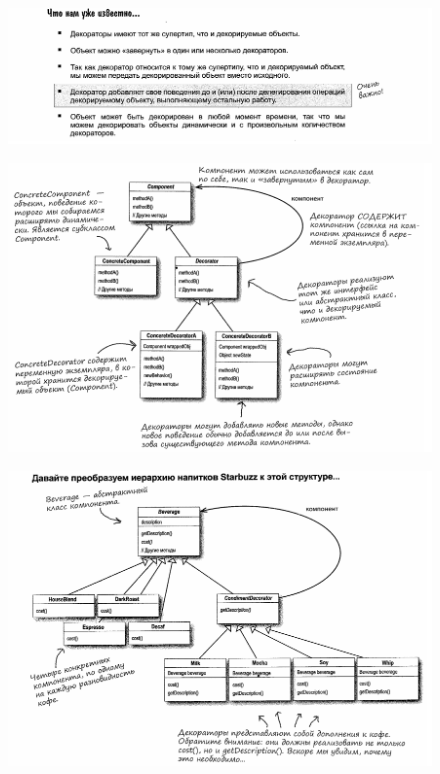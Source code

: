 \documentclass{beamer}
\begin{document}
\begin{frame}
\begin{figure}[h]
\centering
\includegraphics[scale=0.6]{images/lec10-pic15.png}
\label{pic-sort}
\end{figure}
\end{frame}

\begin{frame}
\begin{figure}[h]
\centering
\includegraphics[scale=0.5]{images/lec10-pic16.png}
\label{pic-sort}
\end{figure}
\end{frame}

\begin{frame}
\begin{figure}[h]
\centering
\includegraphics[scale=0.5]{images/lec10-pic17.png}
\label{pic-sort}
\end{figure}
\end{frame}
\end{document}
